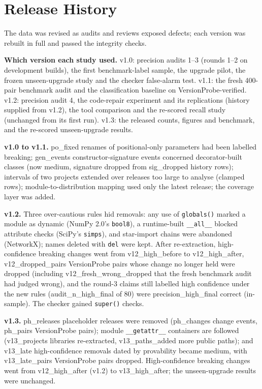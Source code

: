 \documentclass[10pt,twocolumn,letterpaper]{article}
\begin{document}
\appendix
\section{Release History}\label{sec:history}
The data was revised as audits and reviews exposed defects; each version was rebuilt in full and passed the integrity
checks.

\textbf{Which version each study used.} v1.0: precision audits 1--3 (rounds 1--2 on development builds), the
first benchmark-label sample, the upgrade pilot, the frozen unseen-upgrade study and the checker false-alarm test. v1.1:
the fresh 400-pair benchmark audit and the classification baseline on VersionProbe-verified. v1.2: precision audit 4,
the code-repair experiment and its replications (history supplied from v1.2), the tool comparison and the re-scored
recall study (unchanged from its first run). v1.3: the released counts, figures and benchmark, and the re-scored
unseen-upgrade results.

\textbf{v1.0 to v1.1.} {{po_fixed}} renames of positional-only parameters had been labelled breaking; {{gen_events}}
constructor-signature events concerned decorator-built classes (now medium, signature dropped from {{sig_dropped}}
history rows); intervals of two projects extended over releases too large to analyse ({{clamped}} rows); module-to-distribution mapping used only the latest release; the coverage layer was added.

\textbf{v1.2.} Three over-cautious rules hid removals: any use of \texttt{globals()} marked a module as dynamic (NumPy
2.0's \texttt{bool8}), a runtime-built \texttt{\_\_all\_\_} blocked attribute checks (SciPy's \texttt{simps}), and
star-import chains were abandoned (NetworkX); names deleted with \texttt{del} were kept. After re-extraction,
high-confidence breaking changes went from {{v12_high_before}} to {{v12_high_after}}, {{v12_dropped_pairs}} VersionProbe
pairs whose change no longer held were dropped (including {{v12_fresh_wrong_dropped}} that the fresh benchmark audit had
judged wrong), and the round-3 claims still labelled high confidence under the new rules ({{audit_n_high_final}} of 80) were
{{precision_high_final}} correct (in-sample). The checker gained \texttt{super()} checks.

\textbf{v1.3.} {{ph_releases}} placeholder releases were removed ({{ph_changes}} change events, {{ph_pairs}}
VersionProbe pairs); module \texttt{\_\_getattr\_\_} containers are followed ({{v13_projects}} libraries re-extracted,
{{v13_paths_added}} more public paths); and {{v13_late}} high-confidence removals dated by provability became medium,
with {{v13_late_pairs}} VersionProbe pairs dropped. High-confidence breaking changes went from {{v12_high_after}} (v1.2) to
{{v13_high_after}}; the unseen-upgrade results were unchanged.
\end{document}
